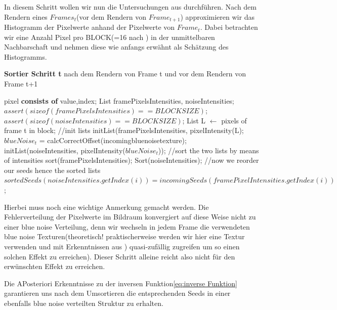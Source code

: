 In diesem Schritt wollen wir nun die Untersuchungen aus 
 durchführen. Nach dem Rendern eines
$Frames_{t}$(vor dem Rendern von $Frame_{t+1}$) approximieren wir das Histogramm
der Pixelwerte anhand der Pixelwerte von $Frame_{t}$. Dabei betrachten wir
eine Anzahl Pixel pro BLOCK(=16 nach \cite{hal02158423}) in der unmittelbaren Nachbarschaft 
und nehmen diese wie anfangs erwähnt als Schätzung des Histogramms.

\cite{hal02158423}
\begin{algorithm}[H]
    \caption{\textbf{Sortier Schritt t} nach dem Rendern von Frame t
    und vor dem Rendern von Frame t+1}
    \begin{algorithmic}[1]
        \State pixel \textbf{consists of} value,index;
        \State List framePixelsIntensities, noiseIntensities;
        \State $assert(sizeof(framePixelsIntensities)==BLOCKSIZE)$;
        \State $assert(sizeof(noiseIntensities)==BLOCKSIZE)$;
        \State List L $\leftarrow$ pixels of frame t in block;
        \State \hfill
        \State //init lists
        \State initList(framePixelsIntensities, pixelIntensity(L);
        \State $blueNoise_{t}$ = calcCorrectOffset(incomingbluenoisetexture);
        \State initList(noiseIntensities, pixelIntensity($blueNoise_{t}$));
        \State \hfill
        \State //sort the two lists by means of intensities
        \State sort(framePixelsIntensities);
        \State Sort(noiseIntensities);
        \State \hfill
        \State //now we reorder our seeds hence the sorted lists
        \State $sortedSeeds(noiseIntensities.getIndex(i)) = incomingSeeds(framePixelIntensities.getIndex(i))$;
        \EndFor
    \end{algorithmic}
    \label{alg:Sortier}
\end{algorithm}

Hierbei muss noch eine wichtige Anmerkung gemacht werden. Die Fehlerverteilung
der Pixelwerte im Bildraum konvergiert auf diese Weise nicht zu einer 
blue noise Verteilung, denn wir wechseln in jedem Frame die 
verwendeten blue noise Texturen(theoretisch! praktischerweise werden wir hier eine
Textur verwenden und mit Erkenntnissen aus ) 
quasi-zufällig zugreifen um so einen solchen Effekt zu erreichen). 
Dieser Schritt alleine reicht also nicht für den erwünschten Effekt zu erreichen.


Die APosteriori Erkenntnisse zu der inversen Funktion\ref{eq:inverse Funktion} garantieren uns nach dem
Umsortieren die entsprechenden Seeds in einer ebenfalls blue noise verteilten Struktur zu erhalten.  

